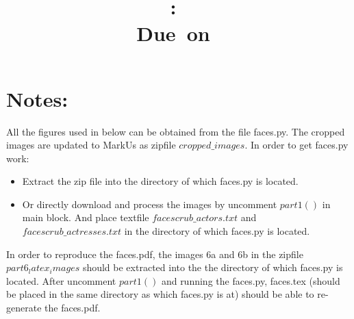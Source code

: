 \documentclass{article}
\title{
\vspace{2in}
\textmd{\textbf{\hmwkClass:\ \hmwkTitle}}\\
\normalsize\vspace{0.1in}\small{Due\ on\ \hmwkDueDate}\\
\vspace{0.1in}
\vspace{3in}
}
\author{\textbf{\hmwkAuthorName}}
\begin{document}
\maketitle
\clearpage

\section*{Notes:}
All the figures used in below can be obtained from the file faces.py. The cropped images are updated to MarkUs as zipfile $cropped\_images$. In order to get faces.py work:
\begin{itemize}
\item Extract the zip file into the directory of which faces.py is located.
\item Or directly download and process the images by uncomment $part1()$ in main block. And place textfile $facescrub\_actors.txt$ and $facescrub\_actresses.txt$ in the directory of which faces.py is located.
\end{itemize}
In order to reproduce the faces.pdf, the images 6a and 6b in the zipfile $part6_latex_images$ should be extracted into the the directory of which faces.py is located. After uncomment $part1()$ and running the faces.py, faces.tex (should be placed in the same directory as which faces.py is at) should be able to  re-generate the faces.pdf.
\clearpage

\end{document}
